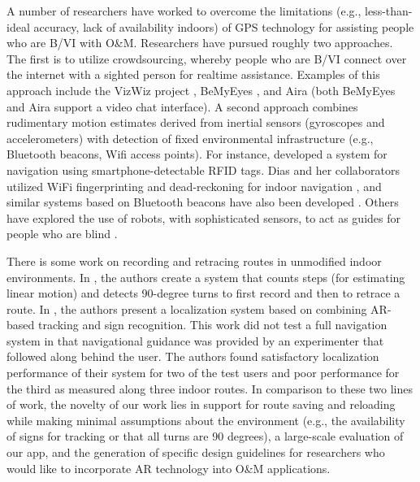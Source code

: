 \documentclass[chi_draft]{sigchi}
\newcommand{\BVI}{B/VI\xspace}
\newcommand{\OM}{O\&M\xspace}
\begin{document}
A number of researchers have worked to overcome the limitations (e.g., less-than-ideal accuracy, lack of availability indoors) of GPS technology for assisting people who are \BVI with \OM.  Researchers have pursued roughly two approaches.  The first is to utilize crowdsourcing, whereby people who are \BVI connect over the internet with a sighted person for realtime assistance.  Examples of this approach include the VizWiz project \cite{bigham2010vizwiz}, BeMyEyes \cite{bemyeyesaccessworld}, and Aira \cite{aira} (both BeMyEyes and Aira support a video chat interface).  A second approach combines rudimentary motion estimates derived from inertial sensors (gyroscopes and accelerometers) with detection of fixed environmental infrastructure (e.g., Bluetooth beacons, Wifi access points).  For instance, \cite{ganz2015percept, ganz2011percept, ganz2014percept} developed a system for navigation using smartphone-detectable RFID tags.  Dias and her collaborators utilized WiFi fingerprinting and dead-reckoning for indoor navigation \cite{Dias__2014_7778}, and similar systems based on Bluetooth beacons have also been developed \cite{ishihara2017beacon, ahmetovic2016navcog}.  Others have explored the use of robots, with sophisticated sensors, to act as guides for people who are blind \cite{Nanavati:2018:CIN:3173386.3176976}.%

There is some work on recording and retracing routes in unmodified indoor environments.  In \cite{flores2018easy, flores2014ariadne}, the authors create a system that counts steps (for estimating linear motion) and detects 90-degree turns to first record and then to retrace a route.  In \cite{fusco2018indoor}, the authors present a localization system based on combining AR-based tracking and sign recognition.  This work did not test a full navigation system in that navigational guidance was provided by an experimenter that followed along behind the user.  The authors found satisfactory localization performance of their system for two of the test users and poor performance for the third as measured along three indoor routes.  In comparison to these two lines of work, the novelty of our work lies in support for route saving and reloading while making minimal assumptions about the environment (e.g., the availability of signs for tracking or that all turns are 90 degrees), a large-scale evaluation of our app, and the generation of specific design guidelines for researchers who would like to incorporate AR technology into \OM applications.
\end{document}
